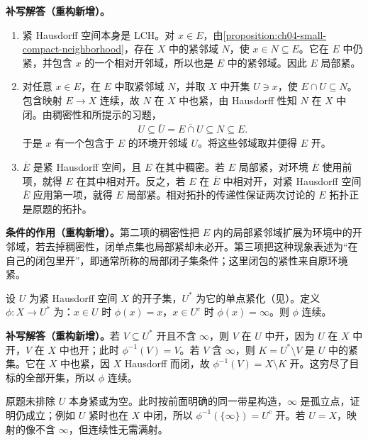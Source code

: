\documentclass[../../main.tex]{subfiles}%
\begin{document}
\begin{solution}
\textbf{补写解答（重构新增）。}
\begin{enumerate}
\item 紧 Hausdorff 空间本身是 LCH。对 $x\in E$，由\cref{proposition:ch04-small-compact-neighborhood}，存在 $X$ 中的紧邻域 $N$，使 $x\in N\subseteq E$。它在 $E$ 中仍紧，并包含 $x$ 的一个相对开邻域，所以也是 $E$ 中的紧邻域。因此 $E$ 局部紧。
\item 对任意 $x\in E$，在 $E$ 中取紧邻域 $N$，并取 $X$ 中开集 $U\ni x$，使 $E\cap U\subseteq N$。包含映射 $E\to X$ 连续，故 $N$ 在 $X$ 中也紧，由 Hausdorff 性知 $N$ 在 $X$ 中闭。由稠密性和所提示的习题，
\begin{align*}
U\subseteq\overline U=\overline{E\cap U}\subseteq N\subseteq E.
\end{align*}
于是 $x$ 有一个包含于 $E$ 的环境开邻域 $U$。将这些邻域取并便得 $E$ 开。
\item $\overline E$ 是紧 Hausdorff 空间，且 $E$ 在其中稠密。若 $E$ 局部紧，对环境 $\overline E$ 使用前项，就得 $E$ 在其中相对开。反之，若 $E$ 在 $\overline E$ 中相对开，对紧 Hausdorff 空间 $\overline E$ 应用第一项，就得 $E$ 局部紧。相对拓扑的传递性保证两次讨论的 $E$ 拓扑正是原题的拓扑。
\end{enumerate}
\end{solution}
\begin{remark}
\textbf{条件的作用（重构新增）。}第二项的稠密性把 $E$ 内的局部紧邻域扩展为环境中的开邻域，若去掉稠密性，闭单点集也局部紧却未必开。第三项把这种现象表述为“在自己的闭包里开”，即通常所称的局部闭子集条件；这里闭包的紧性来自原环境紧。
\end{remark}
\begin{exercise}\label{exercise:ch04-collapse-complement}
设 $U$ 为紧 Hausdorff 空间 $X$ 的开子集，$U^*$ 为它的单点紧化（见）。定义 $\phi:X\to U^*$ 为：$x\in U$ 时 $\phi(x)=x$，$x\in U^c$ 时 $\phi(x)=\infty$。则 $\phi$ 连续。
\end{exercise}
\begin{solution}
\textbf{补写解答（重构新增）。}若 $V\subseteq U^*$ 开且不含 $\infty$，则 $V$ 在 $U$ 中开，因为 $U$ 在 $X$ 中开，$V$ 在 $X$ 中也开；此时 $\phi^{-1}(V)=V$。若 $V$ 含 $\infty$，则 $K=U^*\setminus V$ 是 $U$ 中的紧集。它在 $X$ 中也紧，因 $X$ Hausdorff 而闭，故 $\phi^{-1}(V)=X\setminus K$ 开。这穷尽了目标的全部开集，所以 $\phi$ 连续。

原题未排除 $U$ 本身紧或为空。此时按前面明确的同一带星构造，$\infty$ 是孤立点，证明仍成立；例如 $U$ 紧时也在 $X$ 中闭，所以 $\phi^{-1}(\{\infty\})=U^c$ 开。若 $U=X$，映射的像不含 $\infty$，但连续性无需满射。
\end{solution}
\end{document}
